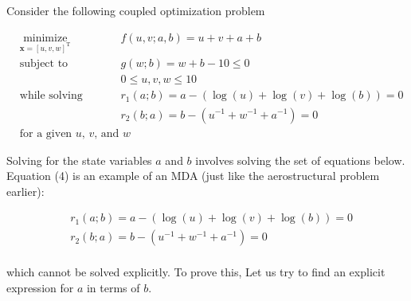 \documentclass[11pt]{article}
\begin{document}
Consider the following coupled optimization problem

\begin{equation*}
    \begin{aligned}
        & \underset{\mathbf{x} = \left[u,v,w\right]^\mathrm{T}}{\text{minimize}}
        & & f(u,v;a,b) = u+v+a+b\\
        & \text{subject to}
        & & g(w;b) = w + b -10 \leq 0\\
        & & & 0 \leq u,v,w \leq 10\\
        & \text{while solving}
        & & r_1(a;b) = a - \left(\log(u) + \log(v) + \log(b)\right) = 0\\
        & & & r_2(b;a) = b - \left(u^{-1} + w^{-1} + a^{-1}\right) = 0\\
        & \text{for a given $u$, $v$, and $w$}
    \end{aligned}
    \tag{3}
\end{equation*}

Solving for the state variables \(a\) and \(b\) involves solving the set
of equations below. Equation (4) is an example of an MDA (just like the
aerostructural problem earlier):

\begin{equation*}
    \begin{aligned}
        & r_1(a;b) = a - \left(\log(u) + \log(v) + \log(b)\right) = 0\\
        & r_2(b;a) = b - \left(u^{-1} + w^{-1} + a^{-1}\right) = 0\\
    \end{aligned}
    \tag{4}
\end{equation*}

which cannot be solved explicitly. To prove this, Let us try to find an
explicit expression for \(a\) in terms of \(b\).
\end{document}
